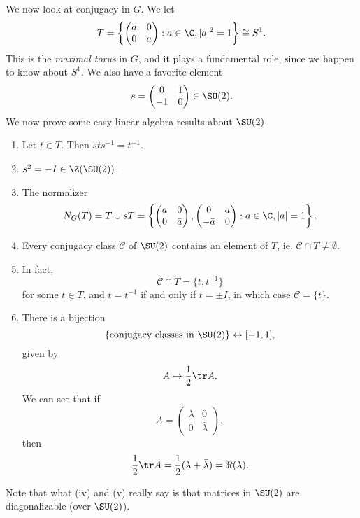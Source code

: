 \documentclass[a4paper]{article}
\begin{document}
We now look at conjugacy in $G$. We let
\[
  T = \left\{
    \begin{pmatrix}
      a & 0\\
      0 & \bar{a}
    \end{pmatrix}: a \in \C, |a|^2 = 1
  \right\} \cong S^1.
\]
This is the \emph{maximal torus} in $G$, and it plays a fundamental role, since we happen to know about $S^1$. We also have a favorite element
\[
  s =
  \begin{pmatrix}
    0 & 1\\
    -1 & 0
  \end{pmatrix} \in \SU(2).
\]
We now prove some easy linear algebra results about $\SU(2)$.
\begin{lemma}\leavevmode
  \begin{enumerate}
    \item Let $t \in T$. Then $sts^{-1} = t^{-1}$.
    \item $s^2 = -I \in \Z(\SU(2))$.
    \item The normalizer
      \[
        N_G(T) = T \cup sT =
        \left\{
          \begin{pmatrix}
            a & 0\\
            0 & \bar{a}
          \end{pmatrix},
          \begin{pmatrix}
            0 & a\\
            -\bar{a} & 0
          \end{pmatrix}: a \in \C, |a| = 1\right\}.
      \]
    \item Every conjugacy class $\mathcal{C}$ of $\SU(2)$ contains an element of $T$, ie. $\mathcal{C} \cap T \not= \emptyset$.

    \item In fact,
      \[
        \mathcal{C} \cap T = \{t, t^{-1}\}
      \]
      for some $t \in T$, and $t = t^{-1}$ if and only if $t = \pm I$, in which case $\mathcal{C} = \{t\}$.
    \item There is a bijection
      \[
        \{\text{conjugacy classes in }\SU(2)\} \leftrightarrow [-1, 1],
      \]
      given by
      \[
        A \mapsto \frac{1}{2} \tr A.
      \]
      We can see that if
      \[
        A =
        \begin{pmatrix}
          \lambda & 0\\
          0 & \bar{\lambda}
        \end{pmatrix},
      \]
      then
      \[
        \frac{1}{2}\tr A = \frac{1}{2}(\lambda + \bar{\lambda}) = \Re(\lambda).
      \]
  \end{enumerate}
\end{lemma}
Note that what (iv) and (v) really say is that matrices in $\SU(2)$ are diagonalizable (over $\SU(2)$).
\end{document}
